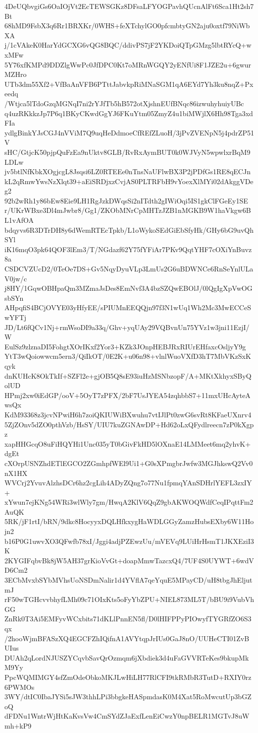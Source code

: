 4DeUQbvgiGs6OaIOjVt2EcTEWSGKz8DFsaLFYOGPavhQUcnAlFt6Sca1Ht2sh7Bt
68hMD9FsbX3q6Rr1BRXKr/0WHS+feXTchylGO0pfcmbtyGN2aju0oxtf79NiWbXA
j/1cVAkeK0HarYdGCXG6vQG8BQC/ddivPS7jF2YKDoiQTpGMzg5lbtRYcQ+wxMFw
5Y76xfKMPd9DDZlgWwPc0JfDPC0Kt7oMRnWGQY2yENfUi8F1JZE2u+6gwurMZHro
UTb3dm55Xf2+VfBaAnVFB6PTttJabvkpRiMNaSGM1qA6EYd7Yh3ku8nqZ+Pxeedq
/Wtjca5lTdoGzqMGNqI7ni2rYJfTb5hB572otXjshnEUfBNqc86izwuhyhuiyUBc
q4uzRKkkzJp7P6q1BKyCKwdGgYJ6FKuYtm05ZmyZ4u1biMWjlX6Hh98Tga3xdFIa
ydlgBinkYJsCGJ4nVViM7Q9uqHeDdmoeCfREfZLuoH/3jPvZVENpN5j4pdrZP51V
sHC/GtjcK50pjpQuFzEa9nUktv8GLB/RvRxAymBUT0k0WJVyN5wpwlxrBqM9LDLw
jv5btlNfKbkXOgjcgL8Jsqsi6LZ0RTEEe0nTnsNaUFlwBX3P2jPDfGs1RE8qECJn
kL2qRmwYwsNzXlqt39+aEiSRDjxzCvjAS0PLTRFbH9vYoexXlMYi02dAkggVDeg2
92b2wRh1y86bEw8Eie9LH1RgJzkDWqsSi2nITdth2gIWiOqi5IS1gkClFGeEy1SE
r/UKrWBxe3Dl4mJwbr8/Gg1/ZKObMNrCpMHTzJZB1nMGKB9W1haVkgw6BL1vAfOA
bdqyvs6R3DTrDH8y6dWemRTEcTpkb/L1oWykoSEdGiEbSfyHk/GHy6bG9uvQhSYl
iK16mqO3pk64QOF3lEm3/T/NGdazf62Y75fYFiAr7PKv9QqtYHF7cOXiYnBuvz8a
CSDCVZUcD2/0TeOe7DS+Gv5NqyDyuVLp3LmUs2G6uBDWNCe6RnSeYnlULaV0jw/c
j8HY/1GqwOBHpaQm3MZmaJsDes8EmNvf3A4bzSZQwEBOlJ/0lQgIgXpVwOGsbSYn
AHpqfiS4BCjOVYE03yHfyEE/sPIUMnEEQQjn97f3N1wUq1Wh2Mc3MwECCeSwYFTj
JD/Lt6fQCv1Nj+rmWsoDI9a33q/Ghv+yqUAy29VQBvnUn75YVz1w3jni11EzjI/W
EulSz9zlznaDI5FohgtXOrIKxf2Yor3+KZk3JOnpHEBJRxRIUrEHfaxcOsljyY9g
YtT3wQoiowwcm5ern3/QiIkOT/0E2K+u06n98+vlnlWuoVXfD3hT7MbVKzSxKqyk
dnKUHcK8OkTkIf+SZFl2e+gjOB5Q8sE93iuHzMSNbzopF/A+MKtXkhyxSByQolUD
HPmj2xw0iEdGP/ooV+5OyT7zPFX/2bF7UsJYEA54zqhbbS7+11mxUHcAyteAwsQx
KdM93368z3jcvNPwiH6h7zoiQKIUWiBXwuhu7vtIJlPt0zwG6svRt8KFaeUXnrv4
5ZjZOnv5dZO0pthVzb/HsSY/UIU7kuZGNAwDP+Hd62oLxQFydlreecn7zP0kXgpz
xapHHGcqO8uFiHQYHi1Unc035yT0bGivFkHD5lOXnaE14LMMeet6mq2yhvK+dgEt
cXOrpUSNZhdETlEGCO2ZGmhpfWEl9Ui1+G0sXPmgbrJwfw3MGJhkswQ2Vv0nX1HX
WVCrj2YvuvAlzhsDCr6hz2cgLih4ADyZQng7o77Nu1fpmqYAnSDHrlYEFL3zxIY+
xYwun7ejKNg54WRi3wlWly7gm/HwqA2KlV6QqZ9gbAKWOQWdfCeqIPqttFm2AuQK
5RK/jF1rtI/bRN/9dkc8HocyyxDQLHfkxygHaWDLGGyZamzHubsEXby6W11Hojn2
b16P0G1uwvXO3QFwfb78xI/Jggi4adjPZEwzUu/mVEVq9LUiHrHsmT1JKXEziI3K
2KYGIFqbvBk8jW5AH37grKioVvGt+doapMmwTazcxQ4/7UF4S0UYWT+6wdVD6Cm2
3ECbMvxbSYbMVhsUoNSDmNalir1d4YVflA7qeYquE5MPayCD/uH8tbgJhEljutmJ
rF50wTGHcvvbhyfLMh09c71OIxKts5oFyYbZPU+NIEL873ML5T/bBU9i9VubVhGG
ZnRk0T3Ai5EMFyvWCxbits71dKLlPnnEN5fl/D0lHIFPPyPIOwyfTYGRfZO6S3qx
/2hooWjmBFASzXQ4EGCFZhIQifnA1AVYtqpJrIUs0GaJ8nO/UUHeCTI01ZvBUIus
DUAh2qLordNJUSZYCqvbSavQrOzmqm6jXbdiek3d4uFaGVVRTeKes9bkupMkM9Yy
PpcWQMIMGY4sfZmOdeObkoMKJLwHiLH77RlCFI9tkRMbR3TutD+RXIY0rz6PWMOs
3WY/dtIC0IbaJYSi5sJW3thhLPi3bbgkeHASpmdasK0M4Xat5RoMwcutUp3bGZoQ
dFDNu1WntrWjHtKaKvsVw4CmSYdZJaExfLenEiCwzY0npBELR1MGTvJ8uWmh+kP9

